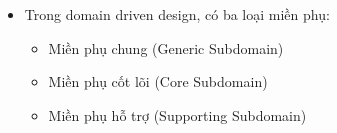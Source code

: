 

\begin{itemize}

\item Trong domain driven design, có ba loại miền phụ:

\begin{itemize}

    \item Miền phụ chung (Generic Subdomain)
    
    \item Miền phụ cốt lõi (Core Subdomain)
    
    \item Miền phụ hỗ trợ (Supporting Subdomain)
    
    \end{itemize}

\end{itemize}